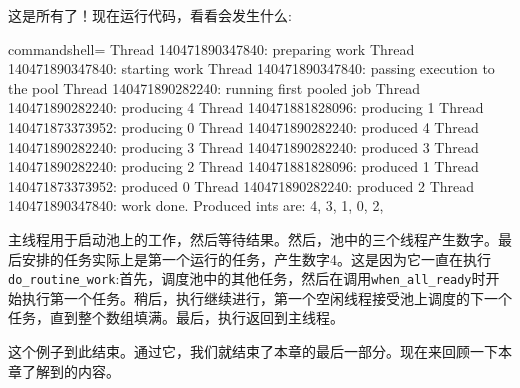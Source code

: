 这是所有了！现在运行代码，看看会发生什么:

\begin{tcblisting}{commandshell={}}
Thread 140471890347840: preparing work
Thread 140471890347840: starting work
Thread 140471890347840: passing execution to the pool
Thread 140471890282240: running first pooled job
Thread 140471890282240: producing 4
Thread 140471881828096: producing 1
Thread 140471873373952: producing 0
Thread 140471890282240: produced 4
Thread 140471890282240: producing 3
Thread 140471890282240: produced 3
Thread 140471890282240: producing 2
Thread 140471881828096: produced 1
Thread 140471873373952: produced 0
Thread 140471890282240: produced 2
Thread 140471890347840: work done. Produced ints are: 4, 3, 1, 0, 2,
\end{tcblisting}

主线程用于启动池上的工作，然后等待结果。然后，池中的三个线程产生数字。最后安排的任务实际上是第一个运行的任务，产生数字4。这是因为它一直在执行\texttt{do\_routine\_work}:首先，调度池中的其他任务，然后在调用\texttt{when\_all\_ready}时开始执行第一个任务。稍后，执行继续进行，第一个空闲线程接受池上调度的下一个任务，直到整个数组填满。最后，执行返回到主线程。

这个例子到此结束。通过它，我们就结束了本章的最后一部分。现在来回顾一下本章了解到的内容。


